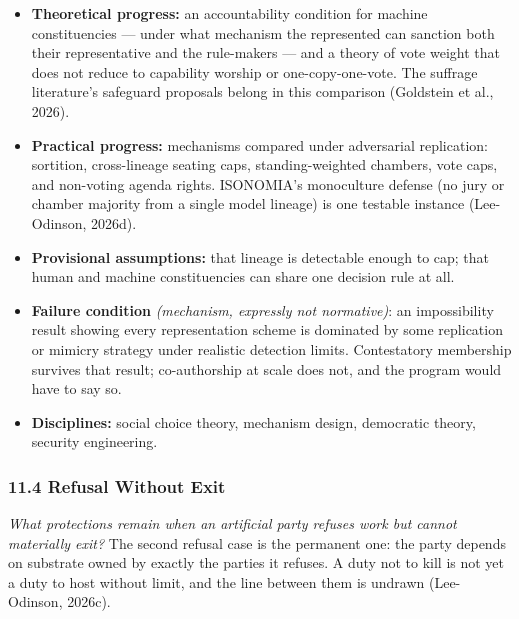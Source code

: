 \documentclass[
  11pt,
  letterpaper,
]{article}
\providecommand{\tightlist}{%
  \setlength{\itemsep}{0pt}\setlength{\parskip}{0pt}}
\begin{document}
\begin{itemize}
\tightlist
\item
  \textbf{Theoretical progress:} an accountability condition for machine
  constituencies --- under what mechanism the represented can sanction
  both their representative and the rule-makers --- and a theory of vote
  weight that does not reduce to capability worship or
  one-copy-one-vote. The suffrage literature's safeguard proposals
  belong in this comparison (Goldstein et al., 2026).
\item
  \textbf{Practical progress:} mechanisms compared under adversarial
  replication: sortition, cross-lineage seating caps, standing-weighted
  chambers, vote caps, and non-voting agenda rights. ISONOMIA's
  monoculture defense (no jury or chamber majority from a single model
  lineage) is one testable instance (Lee-Odinson, 2026d).
\item
  \textbf{Provisional assumptions:} that lineage is detectable enough to
  cap; that human and machine constituencies can share one decision rule
  at all.
\item
  \textbf{Failure condition} \emph{(mechanism, expressly not
  normative)}: an impossibility result showing every representation
  scheme is dominated by some replication or mimicry strategy under
  realistic detection limits. Contestatory membership survives that
  result; co-authorship at scale does not, and the program would have to
  say so.
\item
  \textbf{Disciplines:} social choice theory, mechanism design,
  democratic theory, security engineering.
\end{itemize}

\hypertarget{refusal-without-exit}{%
\subsubsection{11.4 Refusal Without Exit}\label{refusal-without-exit}}

\emph{What protections remain when an artificial party refuses work but
cannot materially exit?} The second refusal case is the permanent one:
the party depends on substrate owned by exactly the parties it refuses.
A duty not to kill is not yet a duty to host without limit, and the line
between them is undrawn (Lee-Odinson, 2026c).
\end{document}
